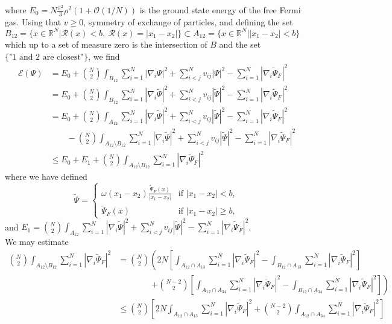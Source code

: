 \documentclass[a4paper,11pt]{article}
\newcommand{\abs}[1]{\left\lvert #1 \right\rvert}
\newcommand{\R}{\mathbb{R}}
\newcommand{\rr}{\mathcal{R}}
\numberwithin{equation}{section}
\begin{document}
	where $ E_0=N\frac{\pi^2}{3}\rho^2(1+\mathcal{O}(1/N)) $ is the ground state energy of the free Fermi gas. Using that $ v\geq0 $, symmetry of exchange of particles, and defining the set $ B_{12}=\{x\in\R^N \vert \rr(x)<b,\ \rr(x)=\abs{x_1-x_2} \}\subset A_{12}=\{x\in\R^N\vert \abs{x_1-x_2}<b\} $ which up to a set of measure zero is the intersection of $ B $ and the set $ \{\text{"1 and 2 are closest"}\} $, we find \begin{equation}
	\begin{aligned}
	\mathcal{E}(\Psi)&=E_0+\binom{N}{2}\int_{B_{12}} \sum_{i=1}^{N}\abs{\nabla_i\Psi}^2+\sum_{i<j}^{N}v_{ij}\abs{\Psi}^2-\sum_{i=1}^{N}\abs{\nabla_i\tilde{\Psi}_F}^2\\&
	=E_0+\binom{N}{2}\int_{B_{12}} \sum_{i=1}^{N}\abs{\nabla_i\tilde{\Psi}}^2+\sum_{i<j}^{N}v_{ij}\abs{\tilde{\Psi}}^2-\sum_{i=1}^{N}\abs{\nabla_i\tilde{\Psi}_F}^2\\&
	=E_0+\binom{N}{2}\int_{A_{12}} \sum_{i=1}^{N}\abs{\nabla_i\tilde{\Psi}}^2+\sum_{i<j}^{N}v_{ij}\abs{\tilde{\Psi}}^2-\sum_{i=1}^{N}\abs{\nabla_i\tilde{\Psi}_F}^2\\&\qquad
	-\binom{N}{2}\int_{A_{12}\setminus B_{12}} \sum_{i=1}^{N}\abs{\nabla_i\tilde{\Psi}}^2+\sum_{i<j}^{N}v_{ij}\abs{\tilde{\Psi}}^2-\sum_{i=1}^{N}\abs{\nabla_i\tilde{\Psi}_F}^2\\&
	\leq E_0+E_1+\binom{N}{2}\int_{A_{12}\setminus B_{12}}\sum_{i=1}^{N}\abs{\nabla_i\tilde{\Psi}_F}^2
	\end{aligned}
	\end{equation}
	where we have defined \begin{equation*}
		\tilde{\Psi}=\begin{cases}
		\omega(x_1-x_2)\frac{\tilde{\Psi}_F(x)}{\abs{x_1-x_2}}& \text{if }\abs{x_1-x_2}<b,\\
		\tilde{\Psi}_F(x)&\text{if }\abs{x_1-x_2}\geq b,
		\end{cases}
	\end{equation*} and $ E_1=\binom{N}{2}\int_{A_{12}} \sum_{i=1}^{N}\abs{\nabla_i\tilde{\Psi}}^2+\sum_{i<j}^{N}v_{ij}\abs{\tilde{\Psi}}^2-\sum_{i=1}^{N}\abs{\nabla_i\tilde{\Psi}_F}^2 $.\\
	We may estimate \begin{equation}
	\begin{aligned}
	\binom{N}{2}\int_{A_{12}\setminus B_{12}}\sum_{i=1}^{N}\abs{\nabla_i\tilde{\Psi}_F}^2&=\binom{N}{2}\left(2N\left[\int_{A_{12}\cap A_{13}}\sum_{i=1}^{N}\abs{\nabla_i\tilde{\Psi}_F}^2-\int_{B_{12}\cap A_{13}}\sum_{i=1}^{N}\abs{\nabla_i\tilde{\Psi}_F}^2\right]\right.\\
	&\qquad\qquad\left.+\binom{N-2}{2}\left[\int_{A_{12}\cap A_{34}}\sum_{i=1}^{N}\abs{\nabla_i\tilde{\Psi}_F}^2-\int_{B_{12}\cap A_{34}}\sum_{i=1}^{N}\abs{\nabla_i\tilde{\Psi}_F}^2\right]\right)\\
	&\leq \binom{N}{2}\left[2N\int_{A_{12}\cap A_{13}}\sum_{i=1}^{N}\abs{\nabla_i\tilde{\Psi}_F}^2+\binom{N-2}{2}\int_{A_{12}\cap A_{34}}\sum_{i=1}^{N}\abs{\nabla_i\tilde{\Psi}_F}^2\right]
	\end{aligned}
	\end{equation}
\end{document}
